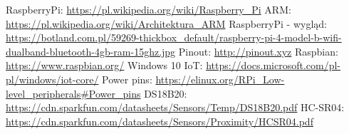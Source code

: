 \newpage
\begin{thebibliography}{9}
  RaspberryPi: \url{https://pl.wikipedia.org/wiki/Raspberry_Pi}
  ARM: \url{https://pl.wikipedia.org/wiki/Architektura_ARM}
  RaspberryPi - wygląd: \url{https://botland.com.pl/59269-thickbox_default/raspberry-pi-4-model-b-wifi-dualband-bluetooth-4gb-ram-15ghz.jpg}
  Pinout: \url{http://pinout.xyz}
  Raspbian: \url{https://www.raspbian.org/}
  Windows 10 IoT: \url{https://docs.microsoft.com/pl-pl/windows/iot-core/}
  Power pins: \url{https://elinux.org/RPi_Low-level_peripherals#Power_pins}
  DS18B20: \url{https://cdn.sparkfun.com/datasheets/Sensors/Temp/DS18B20.pdf}
  HC-SR04: \url{https://cdn.sparkfun.com/datasheets/Sensors/Proximity/HCSR04.pdf}
\end{thebibliography}